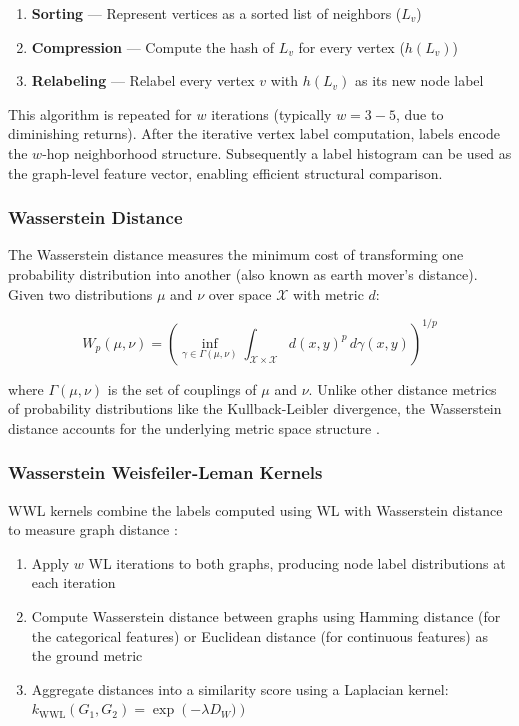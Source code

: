 \begin{enumerate}
    \item \textbf{Sorting} — Represent vertices as a sorted list of neighbors
        ($L_v$)
    \item \textbf{Compression} — Compute the hash of $L_v$ for every vertex
        ($h(L_v)$)
    \item \textbf{Relabeling} — Relabel every vertex $v$ with $h(L_v)$ as its
        new node label
\end{enumerate}

This algorithm is repeated for $w$ iterations (typically $w = 3-5$, due to
diminishing returns). After the iterative vertex label computation, labels
encode the $w$-hop neighborhood structure. Subsequently a label histogram can
be used as the graph-level feature vector, enabling efficient structural
comparison.


\subsubsection{Wasserstein Distance}

The Wasserstein distance measures the minimum cost of transforming one
probability distribution into another (also known as earth mover's distance).
Given two distributions $\mu$ and $\nu$ over space $\mathcal{X}$ with metric $d$:

\begin{equation}
W_p(\mu, \nu) = \left(\inf_{\gamma \in \Gamma(\mu, \nu)} \int_{\mathcal{X} \times \mathcal{X}} d(x, y)^p \, d\gamma(x, y)\right)^{1/p}
\end{equation}

where $\Gamma(\mu, \nu)$ is the set of couplings of $\mu$ and $\nu$.
Unlike other distance metrics of probability distributions like the
Kullback-Leibler divergence, the Wasserstein distance accounts for the
underlying metric space structure \citep{WWL}.

\subsubsection{Wasserstein Weisfeiler-Leman Kernels}

WWL kernels combine the labels computed using WL with Wasserstein distance to
measure graph distance \citep{WWL}:

\begin{enumerate}
    \item Apply $w$ WL iterations to both graphs, producing node label
        distributions at each iteration
    \item Compute Wasserstein distance between graphs using Hamming distance
        (for the categorical features) or Euclidean distance (for continuous
        features) as the ground metric
    \item Aggregate distances into a similarity score using a Laplacian kernel:\\
        $k_{\text{WWL}}(G_1, G_2) = \exp\left(-\lambda  D_W)\right)$
\end{enumerate}


